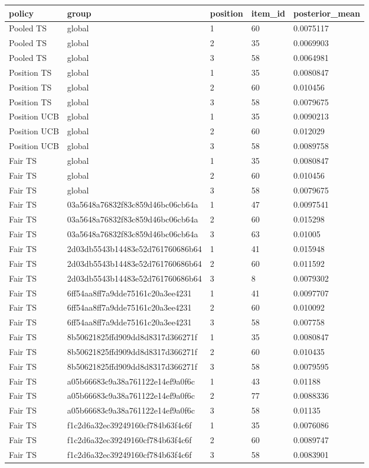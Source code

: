 \begin{tabular}{lllll}
\hline
policy & group & position & item\_id & posterior\_mean \\
\hline
Pooled TS & global & 1 & 60 & 0.0075117 \\
Pooled TS & global & 2 & 35 & 0.0069903 \\
Pooled TS & global & 3 & 58 & 0.0064981 \\
Position TS & global & 1 & 35 & 0.0080847 \\
Position TS & global & 2 & 60 & 0.010456 \\
Position TS & global & 3 & 58 & 0.0079675 \\
Position UCB & global & 1 & 35 & 0.0090213 \\
Position UCB & global & 2 & 60 & 0.012029 \\
Position UCB & global & 3 & 58 & 0.0089758 \\
Fair TS & global & 1 & 35 & 0.0080847 \\
Fair TS & global & 2 & 60 & 0.010456 \\
Fair TS & global & 3 & 58 & 0.0079675 \\
Fair TS & 03a5648a76832f83c859d46bc06cb64a & 1 & 47 & 0.0097541 \\
Fair TS & 03a5648a76832f83c859d46bc06cb64a & 2 & 60 & 0.015298 \\
Fair TS & 03a5648a76832f83c859d46bc06cb64a & 3 & 63 & 0.01005 \\
Fair TS & 2d03db5543b14483e52d761760686b64 & 1 & 41 & 0.015948 \\
Fair TS & 2d03db5543b14483e52d761760686b64 & 2 & 60 & 0.011592 \\
Fair TS & 2d03db5543b14483e52d761760686b64 & 3 & 8 & 0.0079302 \\
Fair TS & 6ff54aa8ff7a9dde75161c20a3ee4231 & 1 & 41 & 0.0097707 \\
Fair TS & 6ff54aa8ff7a9dde75161c20a3ee4231 & 2 & 60 & 0.010092 \\
Fair TS & 6ff54aa8ff7a9dde75161c20a3ee4231 & 3 & 58 & 0.007758 \\
Fair TS & 8b50621825ffd909dd8d8317d366271f & 1 & 35 & 0.0080847 \\
Fair TS & 8b50621825ffd909dd8d8317d366271f & 2 & 60 & 0.010435 \\
Fair TS & 8b50621825ffd909dd8d8317d366271f & 3 & 58 & 0.0079595 \\
Fair TS & a05b66683c9a38a761122e14ef9a0f6c & 1 & 43 & 0.01188 \\
Fair TS & a05b66683c9a38a761122e14ef9a0f6c & 2 & 77 & 0.0088336 \\
Fair TS & a05b66683c9a38a761122e14ef9a0f6c & 3 & 58 & 0.01135 \\
Fair TS & f1c2d6a32ec39249160cf784b63f4c6f & 1 & 35 & 0.0076086 \\
Fair TS & f1c2d6a32ec39249160cf784b63f4c6f & 2 & 60 & 0.0089747 \\
Fair TS & f1c2d6a32ec39249160cf784b63f4c6f & 3 & 58 & 0.0083901 \\
\hline
\end{tabular}